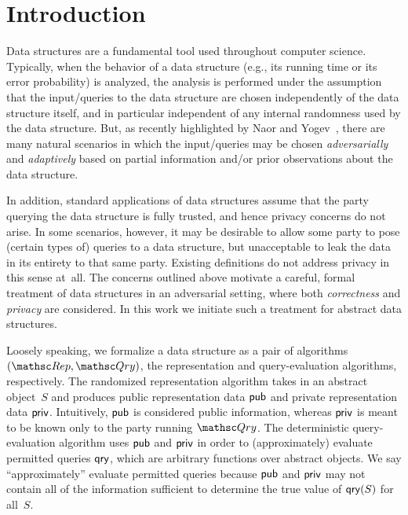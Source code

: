 \section{Introduction}
\label{sec:intro}

Data structures are a fundamental tool used throughout computer
science. Typically, when the behavior of a data structure (e.g., its
running time or its error probability) is analyzed, the analysis is
performed under the assumption that the input/queries to the data
structure are chosen independently of the data structure itself, and
in particular independent of any internal randomness used by the
data structure. But, as recently highlighted by Naor and
Yogev~\cite{naor2015bloom}, there are many natural scenarios in
which the input/queries may be chosen \emph{adversarially} and
\emph{adaptively} based on partial information and/or prior
observations about the data structure.

In addition, standard applications of data structures assume that
the party querying the data structure is fully trusted, and hence
privacy concerns do not arise. In some scenarios, however, it may be
desirable to allow some party to pose (certain types of) queries to
a data structure, but unacceptable to leak the data in its entirety
to that same party. Existing definitions do not address privacy in
this sense at~all. The concerns outlined above motivate a careful, formal treatment of data structures in an adversarial setting, 
where both \emph{correctness} and \emph{privacy} are considered. In this work we initiate such a
treatment for abstract data structures.  

Loosely speaking, we formalize a data structure as a pair of algorithms $(\Rep,\Qry)$, the representation and query-evaluation algorithms, respectively.  The randomized representation algorithm takes in an abstract object~$S$ and produces public representation data ${\sf pub}$ and private representation data ${\sf priv}$.  Intuitively, ${\sf pub}$ is considered public information, whereas ${\sf priv}$ is meant to be known only to the party running $\Qry$.  The deterministic query-evaluation algorithm uses ${\sf pub}$ and ${\sf priv}$ in order to (approximately) evaluate permitted queries $\mathsf{qry}$, which are arbitrary functions over abstract objects.  We say ``approximately''  evaluate permitted queries because ${\sf pub}$ and ${\sf priv}$ may not contain all of the information sufficient to determine the true value of $\mathsf{qry}(S)$ for all~$S$.  


